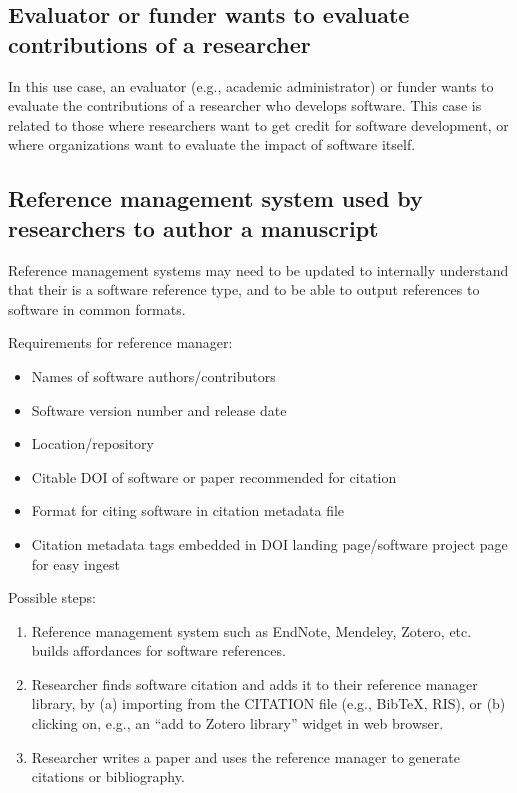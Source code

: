 \documentclass[12pt, oneside]{amsart}
\begin{document}
\subsection{Evaluator or funder wants to evaluate contributions of a researcher}

In this use case, an evaluator (e.g., academic administrator) or funder wants
to evaluate the contributions of a researcher who develops software. This case
is related to those where researchers want to get credit for software
development, or where organizations want to evaluate the impact of software
itself.

\subsection{Reference management system used by researchers to author a manuscript}

Reference management systems may need to be updated to internally understand that their is a software reference type, and to be able to output references to software in common formats.

Requirements for reference manager:
\begin{itemize}
\item Names of software authors/contributors
\item Software version number and release date
\item Location/repository
\item Citable DOI of software or paper recommended for citation
\item Format for citing software in citation metadata file
\item Citation metadata tags embedded in DOI landing page/software project page for easy ingest
\end{itemize}

Possible steps:
\begin{enumerate}
\item Reference management system such as EndNote, Mendeley, Zotero, etc. builds affordances for software references.
\item Researcher finds software citation and adds it to their reference manager library, by (a) importing from the CITATION file (e.g., BibTeX, RIS), or (b) clicking on, e.g., an ``add to Zotero library'' widget in web browser.
\item Researcher writes a paper and uses the reference manager to generate citations or bibliography.
\end{enumerate}
\end{document}
